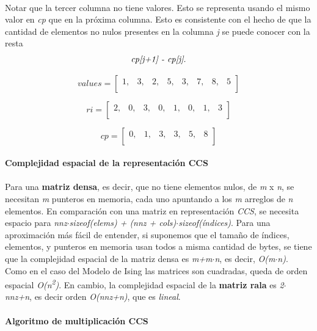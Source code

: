 \documentclass[a4paper,11pt]{article}
\begin{document}
\paragraph{}
Notar que la tercer columna no tiene valores. Esto se representa usando el mismo valor en \emph{cp} que en la pr\'oxima columna. Esto es consistente con el hecho de que la cantidad de elementos no nulos presentes en la columna \emph{j} se puede conocer con la resta \[\emph{cp[j+1] - cp[j]}.\]

\[ values = \left[ \begin{array}{cccccccc}
1, & 3, & 2, & 5, & 3, & 7, & 8, & 5 \\\end{array} \right]\]

\[ ri = \left[ \begin{array}{cccccccc}
2, & 0, & 3, & 0, & 1, & 0, & 1, & 3 \\\end{array} \right]\]

\[ cp = \left[ \begin{array}{cccccc}
0, & 1, & 3, & 3, & 5, & 8\\\end{array} \right]\]
\\
\textbf{Complejidad espacial de la representaci\'on CCS}
\paragraph{}
Para una \textbf{matriz densa}, es decir, que no tiene elementos nulos, de \emph{m} x \emph{n}, se necesitan \emph{m} punteros en memoria, cada uno apuntando a los \emph{m} arreglos de \emph{n} elementos. En comparaci\'on con una matriz en representaci\'on \emph{CCS}, se necesita espacio para \emph{nnz$\cdot$sizeof(elems) + (nnz + cols)$\cdot$sizeof(\'indices)}. Para una aproximaci\'on m\'as f\'acil de entender, si suponemos que el tamaño de \'indices, elementos, y punteros en memoria usan todos a misma cantidad de bytes, se tiene que la complejidad espacial de la matriz densa es \emph{m+m$\cdot$n}, es decir, \emph{O(m$\cdot$n)}. Como en el caso del Modelo de Ising las matrices son cuadradas, queda de orden espacial \emph{O(n\textsuperscript{2})}. En cambio, la complejidad espacial de la \textbf{matriz rala} es \emph{2$\cdot$nnz+n}, es decir orden \emph{O(nnz+n)}, que es \emph{lineal}.\\
\\
\textbf{Algoritmo de multiplicaci\'on CCS}
\end{document}
